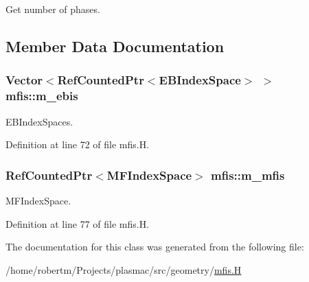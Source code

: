 Get number of phases. 



\subsection{Member Data Documentation}
\subsubsection[{\texorpdfstring{m\+\_\+ebis}{m_ebis}}]{\setlength{\rightskip}{0pt plus 5cm}Vector$<$Ref\+Counted\+Ptr$<$E\+B\+Index\+Space$>$ $>$ mfis\+::m\+\_\+ebis\hspace{0.3cm}{\ttfamily [protected]}}\hypertarget{classmfis_af4f5f4f5369510dd59ee0e417b9049da}{}\label{classmfis_af4f5f4f5369510dd59ee0e417b9049da}


E\+B\+Index\+Spaces. 



Definition at line 72 of file mfis.\+H.

\subsubsection[{\texorpdfstring{m\+\_\+mfis}{m_mfis}}]{\setlength{\rightskip}{0pt plus 5cm}Ref\+Counted\+Ptr$<$M\+F\+Index\+Space$>$ mfis\+::m\+\_\+mfis\hspace{0.3cm}{\ttfamily [protected]}}\hypertarget{classmfis_a3a34f577f423a088458d19ec1c37737d}{}\label{classmfis_a3a34f577f423a088458d19ec1c37737d}


M\+F\+Index\+Space. 



Definition at line 77 of file mfis.\+H.



The documentation for this class was generated from the following file\+:\begin{DoxyCompactItemize}
\item 
/home/robertm/\+Projects/plasmac/src/geometry/\hyperlink{mfis_8H}{mfis.\+H}\end{DoxyCompactItemize}

